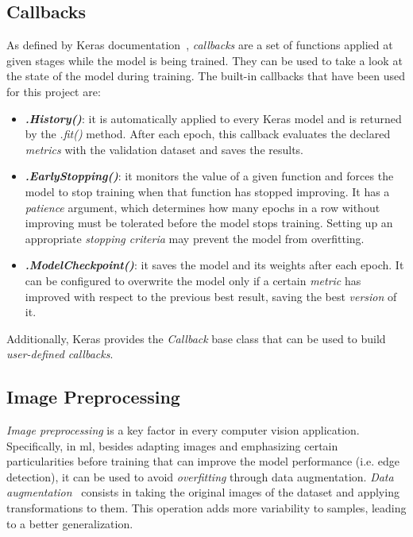 \subsection{Callbacks} \label{subsec:callbacks}
As defined by Keras documentation~\cite{chollet2015keras}, \emph{callbacks} are a set of functions applied at given stages while the model is being trained. They can be used to take a look at the state of the model during training. The built-in callbacks that have been used for this project are:
\begin{itemize}
	\item \textbf{\textit{.History()}}: it is automatically applied to every Keras model and is returned by the \textit{.fit()} method. After each epoch, this callback evaluates the declared \textit{metrics} with the validation dataset and saves the results.
	
	\item \textbf{\textit{.EarlyStopping()}}: it monitors the value of a given function and forces the model to stop training when that function has stopped improving. It has a \emph{\textit{patience}} argument, which determines how many epochs in a row without improving must be tolerated before the model stops training. Setting up an appropriate \emph{stopping criteria} may prevent the model from overfitting.
	
	\item \textbf{\textit{.ModelCheckpoint()}}: it saves the model and its weights after each epoch. It can be configured to overwrite the model only if a certain \textit{metric} has improved with respect to the previous best result, saving the best \textit{version} of it.
\end{itemize}

Additionally, Keras provides the \textit{Callback} base class that can be used to build \emph{user-defined callbacks}.

\subsection{Image Preprocessing}\label{subsec:utils}
\emph{Image preprocessing} is a key factor in every computer vision application. Specifically, in \gls{ml}, besides adapting images and emphasizing certain particularities before training that can improve the model performance (i.e. edge detection), it can be used to avoid \emph{overfitting} through data augmentation. \emph{Data augmentation}~\cite{DBLP:journals/corr/WongGSM16} consists in taking the original images of the dataset and applying transformations to them. This operation adds more variability to samples, leading to a better generalization.

